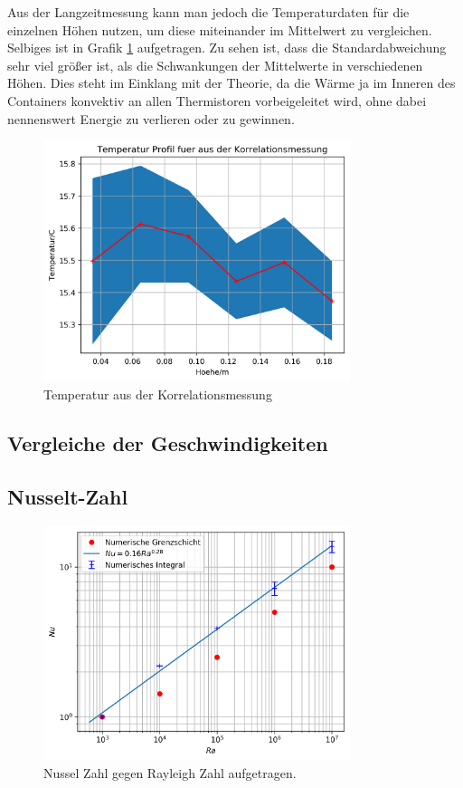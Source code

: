 \documentclass[12pt,a4paper,titlepage,headinclude]{scrartcl}
\numberwithin{equation}{subsection}
\begin{document}
Aus der Langzeitmessung kann man jedoch die Temperaturdaten für die einzelnen Höhen nutzen, um diese miteinander im Mittelwert zu vergleichen.
Selbiges ist in Grafik \ref{fig:T_kor} aufgetragen.
Zu sehen ist, dass die Standardabweichung sehr viel größer ist, als die Schwankungen der Mittelwerte in verschiedenen Höhen.
Dies steht im Einklang mit der Theorie, da die Wärme ja im Inneren des Containers konvektiv an allen Thermistoren vorbeigeleitet wird, ohne dabei nennenswert Energie zu verlieren oder zu gewinnen.
\begin{figure}[!ht]
\centering
\includegraphics[width=0.8\textwidth]{T_kor.png}
\caption{Temperatur aus der Korrelationsmessung}
\label{fig:T_kor}
\end{figure}





\subsection{Vergleiche der Geschwindigkeiten}

\subsection{Nusselt-Zahl}

\begin{figure}[!ht]
\centering
\includegraphics[width=0.8\textwidth]{Nu_Ra.png}
\caption{Nussel Zahl gegen Rayleigh Zahl aufgetragen.}
\label{fig:Nu_Ra}
\end{figure}
\end{document}
